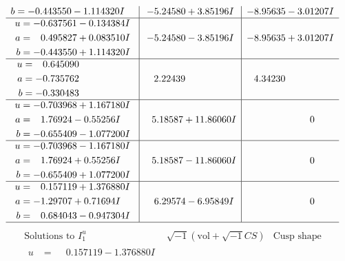 \documentclass[1p]{elsarticle_modified}
\theoremstyle{definition}
\newcommand{\I}{\sqrt{-1}}
\begin{document}
$$\begin{array}{c|c|c}
\begin{aligned}
b &= -0.443550 - 1.114320 I\end{aligned}
 & -5.24580 + 3.85196 I & -8.95635 - 3.01207 I \\ \hline\begin{aligned}
u &= -0.637561 - 0.134384 I \\
a &= \phantom{-}0.495827 + 0.083510 I \\
b &= -0.443550 + 1.114320 I\end{aligned}
 & -5.24580 - 3.85196 I & -8.95635 + 3.01207 I \\ \hline\begin{aligned}
u &= \phantom{-}0.645090\phantom{ +0.000000I} \\
a &= -0.735762\phantom{ +0.000000I} \\
b &= -0.330483\phantom{ +0.000000I}\end{aligned}
 & \phantom{-}2.22439\phantom{ +0.000000I} & \phantom{-}4.34230\phantom{ +0.000000I} \\ \hline\begin{aligned}
u &= -0.703968 + 1.167180 I \\
a &= \phantom{-}1.76924 - 0.55256 I \\
b &= -0.655409 - 1.077200 I\end{aligned}
 & \phantom{-}5.18587 + 11.86060 I & \phantom{-0.000000 } 0 \\ \hline\begin{aligned}
u &= -0.703968 - 1.167180 I \\
a &= \phantom{-}1.76924 + 0.55256 I \\
b &= -0.655409 + 1.077200 I\end{aligned}
 & \phantom{-}5.18587 - 11.86060 I & \phantom{-0.000000 } 0 \\ \hline\begin{aligned}
u &= \phantom{-}0.157119 + 1.376880 I \\
a &= -1.29707 + 0.71694 I \\
b &= \phantom{-}0.684043 - 0.947304 I\end{aligned}
 & \phantom{-}6.29574 - 6.95849 I & \phantom{-0.000000 } 0\\
 \hline 
 \end{array}$$\newpage$$\begin{array}{c|c|c}  
\text{Solutions to }I^u_{1}& \I (\text{vol} + \sqrt{-1}CS) & \text{Cusp shape}\\
 \hline 
\begin{aligned}
u &= \phantom{-}0.157119 - 1.376880 I \\

\end{aligned}
\end{array}$$
\end{document}

